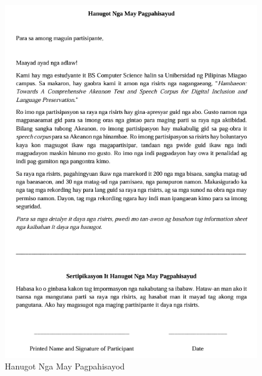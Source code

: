 \begin{figure}[h!]
	\centering
	\includegraphics[width=\textwidth]{./appendix/hanugot_nga_may_pagpahisayod.png}
	\caption{Hanugot Nga May Pagpahisayod}
	\label{fig:hanugotNgaMayPagpahisayod}
\end{figure}

